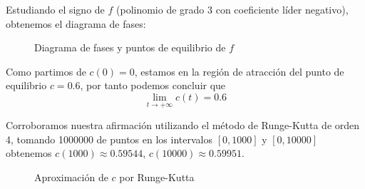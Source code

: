 \documentclass[a4]{article}
\begin{document}
Estudiando el signo de $f$ (polinomio de grado 3 con coeficiente líder
negativo), obtenemos el diagrama de fases: \vspace{-4mm}

\begin{figure}[H]
  \centering
  \caption{Diagrama de fases y puntos de equilibrio de $f$}
  \label{fig:phase}
\end{figure}
\vspace{-5mm}

Como partimos de $c(0)=0$, estamos en la región de atracción del punto
de equilibrio $c=0.6$, por tanto podemos concluir que
\[\lim\limits_{t\to +\infty}c(t)=0.6\]

Corroboramos nuestra afirmación utilizando el método de Runge-Kutta de
orden 4, tomando 1000000 de puntos en los intervalos $[0,1000]$ y
$[0,10000]$ obtenemos $c(1000)\approx 0.59544$,
$c(10000)\approx 0.59951$.

\begin{figure}[H]
  \centering
  \caption{Aproximación de $c$ por Runge-Kutta}
  \label{fig:runge-kutta}
\end{figure}
\end{document}
